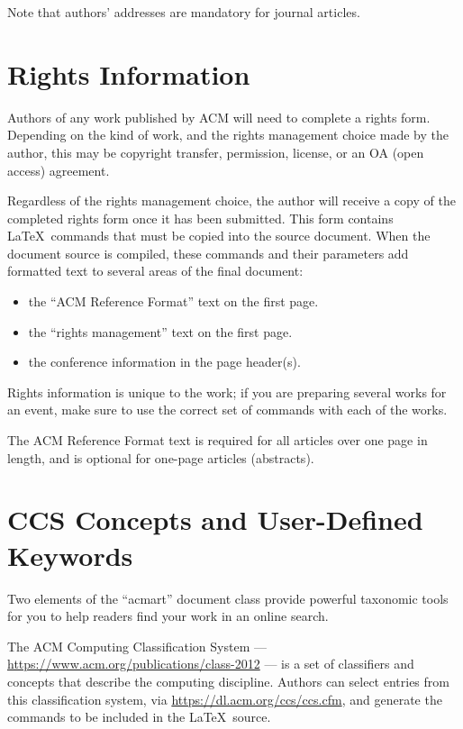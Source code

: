\documentclass[sigconf, authordraft]{acmart}
\begin{document}
	Note that authors' addresses are mandatory for journal articles.

	\section{Rights Information}


	Authors of any work published by ACM will need to complete a rights form.
	Depending on the kind of work, and the rights management choice made by the author,
	this may be copyright transfer, permission, license, or an OA (open access) agreement.

	Regardless of the rights management choice, the author will receive a copy of
	the completed rights form once it has been submitted. This form contains \LaTeX\ commands
	that must be copied into the source document. When the document source is
	compiled, these commands and their parameters add formatted text to several areas
	of the final document:
	\begin{itemize}
		\item the ``ACM Reference Format'' text on the first page.

		\item the ``rights management'' text on the first page.

		\item the conference information in the page header(s).
	\end{itemize}

	Rights information is unique to the work; if you are preparing several works
	for an event, make sure to use the correct set of commands with each of the works.

	The ACM Reference Format text is required for all articles over one page in length,
	and is optional for one-page articles (abstracts).

	\section{CCS Concepts and User-Defined Keywords}


	Two elements of the ``acmart'' document class provide powerful taxonomic tools
	for you to help readers find your work in an online search.

	The ACM Computing Classification System ---
	\url{https://www.acm.org/publications/class-2012} --- is a set of classifiers
	and concepts that describe the computing discipline. Authors can select entries
	from this classification system, via \url{https://dl.acm.org/ccs/ccs.cfm}, and
	generate the commands to be included in the \LaTeX\ source.
\end{document}
